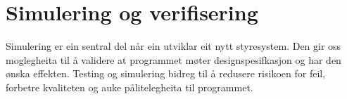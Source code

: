 \chapter{Simulering og verifisering}
\thispagestyle{fancy}

Simulering er ein sentral del når ein utviklar eit nytt styresystem.
Den gir oss moglegheita til å validere at programmet møter designspesifkasjon og har den ønska effekten.
Testing og simulering bidreg til å redusere risikoen for feil, forbetre kvaliteten og auke pålitelegheita til programmet.


